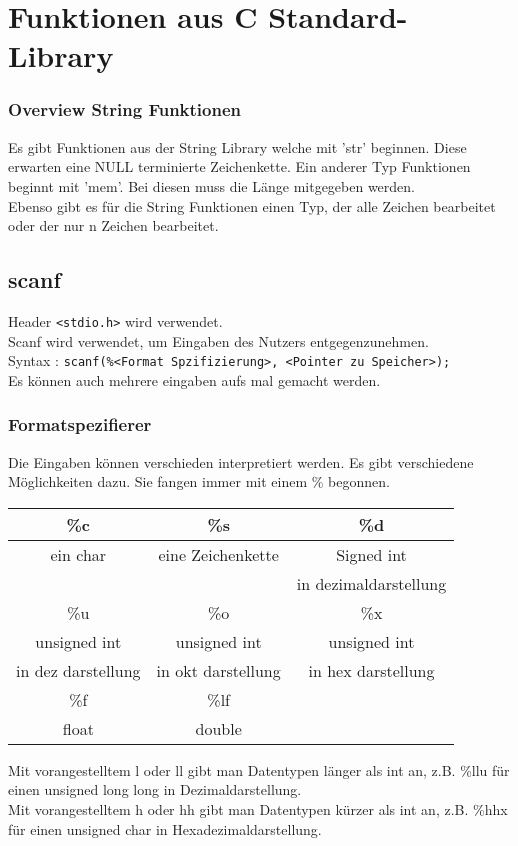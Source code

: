 \section{Funktionen aus  C Standard-Library}
\subsubsection{Overview String Funktionen}
Es gibt Funktionen aus der String Library welche mit 'str' beginnen. Diese erwarten eine NULL terminierte Zeichenkette. Ein anderer Typ Funktionen beginnt mit 'mem'. Bei diesen muss die Länge mitgegeben werden.\\
Ebenso gibt es für die String Funktionen einen Typ, der alle Zeichen bearbeitet oder der nur n Zeichen bearbeitet.

\subsection{scanf}

Header \verb|<stdio.h>| wird verwendet.\\
Scanf wird verwendet, um Eingaben des Nutzers entgegenzunehmen.\\
Syntax : \verb|scanf(%<Format Spzifizierung>, <Pointer zu Speicher>);|\\
Es können auch mehrere eingaben aufs mal gemacht werden.

\subsubsection{Formatspezifierer}

Die Eingaben können verschieden interpretiert werden. Es gibt verschiedene Möglichkeiten dazu. Sie fangen immer mit einem \% begonnen.\\

\begin{center}
    \begin{tabular}{|c|c|c|} \hline  
          \%c& \%s& \%d\\ \hline  
        ein char& eine Zeichenkette& Signed int\\
 & &in dezimaldarstellung\\\hline\hline
 \%u& \%o&\%x\\\hline
 unsigned int& unsigned int&unsigned int\\
  in dez darstellung& in okt darstellung&in hex darstellung\\\hline\hline
 \%f& \%lf&\\\hline
 float& double&\\ \hline
    \end{tabular}
\end{center}
Mit vorangestelltem l oder ll gibt man Datentypen länger als int an, z.B. \%llu für einen unsigned long long in Dezimaldarstellung.\\
Mit vorangestelltem h oder hh gibt man Datentypen kürzer als int an, z.B. \%hhx für einen unsigned char in Hexadezimaldarstellung.\\

